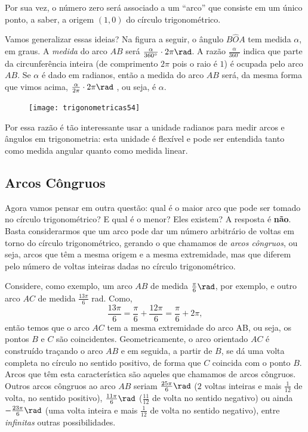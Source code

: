 Por sua vez, o número zero será associado a um “arco”{} que consiste em um único ponto, a saber, a origem $(1,0)$ do círculo trigonométrico.

Vamos generalizar essas ideias? Na figura a seguir, o ângulo ${B\hat{O}A}$ tem medida $\alpha$, em graus. A \textit{medida} do arco $AB$ será  $\frac{\alpha}{360^{\circ}}\cdot2\pi\rad$. A razão $\frac{\alpha}{360^{\circ}}$ indica que parte da circunferência inteira (de comprimento $2\pi$ pois o raio é $1$) é ocupada pelo arco $AB$. Se $\alpha$ é dado em radianos, então a medida do arco $AB$ será, da mesma forma que vimos acima, $\frac{\alpha}{2\pi}\cdot2\pi\rad$ , ou seja, é $\alpha$.

\begin{figure}[H]
\centering

\texttt{[image: trigonometricas54]}
\end{figure}

Por essa razão é tão interessante usar a unidade radianos para medir arcos e ângulos em trigonometria: esta unidade é flexível e pode ser entendida tanto como medida angular quanto como medida linear.

\subsection{Arcos Côngruos}

Agora vamos pensar em outra questão: qual é o maior arco que pode ser tomado no círculo  trigonométrico? E qual é o menor? Eles existem? A resposta é \textbf{não}. Basta considerarmos que um arco pode dar um número arbitrário de voltas em torno do círculo trigonométrico, gerando o que chamamos de \textit{arcos côngruos}, ou seja, arcos que têm a mesma origem e a mesma extremidade, mas que diferem pelo número de voltas inteiras dadas no círculo trigonométrico.

Considere, como exemplo, um arco $AB$ de medida $\frac{\pi}{6} \rad$, por exemplo, e outro arco $AC$ de medida $\frac{13\pi}{6}$ rad. Como, 
\begin{equation*}
\frac{13\pi}{6}=\frac{\pi}{6}+\frac{12\pi}{6}=\frac{\pi}{6}+2\pi,
\end{equation*}
então temos que o arco $AC$ tem a mesma extremidade do arco AB, ou seja, os pontos $B$ e $C$ são coincidentes. Geometricamente, o arco orientado $AC$ é construído traçando o arco $AB$ e em seguida, a partir de $B$, se dá uma volta completa no círculo no sentido positivo, de forma que $C$ coincida com o ponto $B$. Arcos que têm esta característica são aqueles que chamamos de arcos côngruos. Outros arcos côngruos ao arco $AB$ seriam $\frac{25\pi}{6} \rad$ ($2$ voltas inteiras e mais  $\frac{1}{12}$ de volta, no sentido positivo), $\frac{11\pi}{6}\rad$ ($\frac{11}{12}$ de volta no sentido negativo) ou ainda $-\frac{23\pi}{6}\rad$ (uma volta inteira e mais $\frac{1}{12}$ de volta no sentido negativo), entre \textit{infinitas} outras possibilidades.

